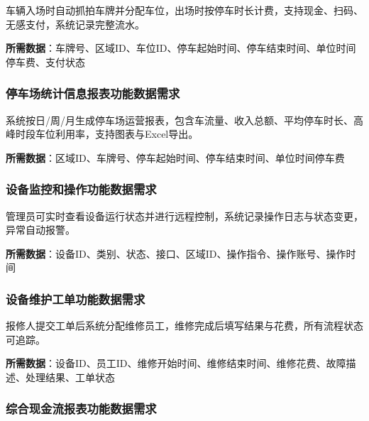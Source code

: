 \documentclass[]{article}
\begin{document}
车辆入场时自动抓拍车牌并分配车位，出场时按停车时长计费，支持现金、扫码、无感支付，系统记录完整流水。

\textbf{所需数据}：车牌号、区域ID、车位ID、停车起始时间、停车结束时间、单位时间停车费、支付状态

\hypertarget{ux505cux8f66ux573aux7edfux8ba1ux4fe1ux606fux62a5ux8868ux529fux80fdux6570ux636eux9700ux6c42}{%
\subsubsection{停车场统计信息报表功能数据需求}\label{ux505cux8f66ux573aux7edfux8ba1ux4fe1ux606fux62a5ux8868ux529fux80fdux6570ux636eux9700ux6c42}}

系统按日/周/月生成停车场运营报表，包含车流量、收入总额、平均停车时长、高峰时段车位利用率，支持图表与Excel导出。

\textbf{所需数据}：区域ID、车牌号、停车起始时间、停车结束时间、单位时间停车费

\hypertarget{ux8bbeux5907ux76d1ux63a7ux548cux64cdux4f5cux529fux80fdux6570ux636eux9700ux6c42}{%
\subsubsection{设备监控和操作功能数据需求}\label{ux8bbeux5907ux76d1ux63a7ux548cux64cdux4f5cux529fux80fdux6570ux636eux9700ux6c42}}

管理员可实时查看设备运行状态并进行远程控制，系统记录操作日志与状态变更，异常自动报警。

\textbf{所需数据}：设备ID、类别、状态、接口、区域ID、操作指令、操作账号、操作时间

\hypertarget{ux8bbeux5907ux7ef4ux62a4ux5de5ux5355ux529fux80fdux6570ux636eux9700ux6c42}{%
\subsubsection{设备维护工单功能数据需求}\label{ux8bbeux5907ux7ef4ux62a4ux5de5ux5355ux529fux80fdux6570ux636eux9700ux6c42}}

报修人提交工单后系统分配维修员工，维修完成后填写结果与花费，所有流程状态可追踪。

\textbf{所需数据}：设备ID、员工ID、维修开始时间、维修结束时间、维修花费、故障描述、处理结果、工单状态

\hypertarget{ux7efcux5408ux73b0ux91d1ux6d41ux62a5ux8868ux529fux80fdux6570ux636eux9700ux6c42}{%
\subsubsection{综合现金流报表功能数据需求}\label{ux7efcux5408ux73b0ux91d1ux6d41ux62a5ux8868ux529fux80fdux6570ux636eux9700ux6c42}}
\end{document}
